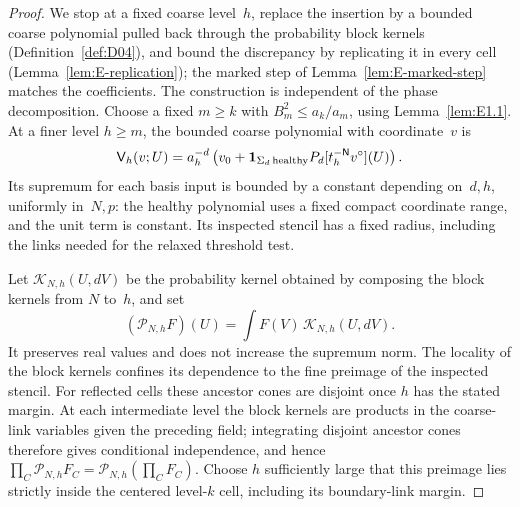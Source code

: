\begin{proof}
We stop at a fixed coarse level~$h$, replace the insertion by a bounded coarse polynomial pulled back through the probability block kernels (Definition~\ref{def:D04}), and bound the discrepancy by replicating it in every cell (Lemma~\ref{lem:E-replication}); the marked step of Lemma~\ref{lem:E-marked-step} matches the coefficients. The construction is independent of the phase decomposition. Choose a fixed $m\ge k$ with $B_m^2\le a_k/a_m$, using Lemma~\ref{lem:E1.1}. At a finer level $h\ge m$, the bounded coarse polynomial with coordinate~$v$ is
\begin{equation*}
 \mathsf V_h(v;U)=a_h^{-d}\left(v_0+
 \mathbf1_{\Sigma_d\,\mathrm{healthy}}P_d[t_h^{-\mathsf{N}}v^\circ](U)\right).
\end{equation*}
Its supremum for each basis input is bounded by a constant depending on~$d,h$, uniformly in~$N,p$: the healthy polynomial uses a fixed compact coordinate range, and the unit term is constant. Its inspected stencil has a fixed radius, including the links needed for the relaxed threshold test.

Let $\mathcal K_{N,h}(U,dV)$ be the probability kernel obtained by composing the block kernels from $N$ to~$h$, and set
\begin{equation*}
 (\mathcal P_{N,h}F)(U)=\int F(V)\,\mathcal K_{N,h}(U,dV).
\end{equation*}
It preserves real values and does not increase the supremum norm. The locality of the block kernels confines its dependence to the fine preimage of the inspected stencil. For reflected cells these ancestor cones are disjoint once $h$ has the stated margin. At each intermediate level the block kernels are products in the coarse-link variables given the preceding field; integrating disjoint ancestor cones therefore gives conditional independence, and hence $\prod_C\mathcal P_{N,h}F_C=\mathcal P_{N,h}(\prod_CF_C)$. Choose $h$ sufficiently large that this preimage lies strictly inside the centered level-$k$ cell, including its boundary-link margin.


\end{proof}

